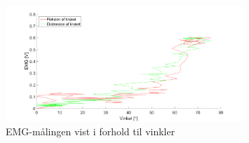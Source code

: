 \begin{figure}[H]
	\centering
	\includegraphics[width=0.8\textwidth]{figures/Pilotforsoeg/emg_vinkler}
	\caption{EMG-målingen vist i forhold til vinkler}
	\label{fig:emgogvinkel}
\end{figure}



%
%
% 
